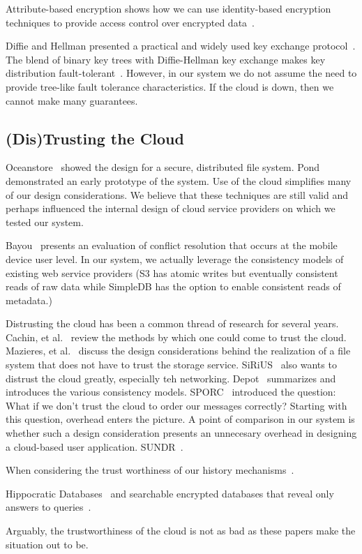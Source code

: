 Attribute-based encryption shows how we can use identity-based
encryption techniques to provide access control over encrypted
data~\cite{abe}. 

Diffie and Hellman presented a practical and widely used key exchange
protocol~\cite{dh}. The blend of binary key trees with Diffie-Hellman
key exchange makes key distribution fault-tolerant~\cite{treekeydist,
  treekeydist2}. However, in our system we do not assume the need to
provide tree-like fault tolerance characteristics. If the cloud is
down, then we cannot make many guarantees.

\subsection{(Dis)Trusting the Cloud}
Oceanstore~\cite{oceanstore} showed the design for a secure,
distributed file system. Pond~\cite{pond} demonstrated an early
prototype of the system. Use of the cloud simplifies many of our
design considerations. We believe that these techniques are still
valid and perhaps influenced the internal design of cloud service
providers on which we tested our system.

Bayou~\cite{bayou} presents an evaluation of conflict resolution that
occurs at the mobile device user level. In our system, we actually
leverage the consistency models of existing web service providers (S3
has atomic writes but eventually consistent reads of raw data while
SimpleDB has the option to enable consistent reads of metadata.)

Distrusting the cloud has been a common thread of research for several
years. Cachin, et al.~\cite{trusting} review the methods by which one
could come to trust the cloud. Mazieres, et al.~\cite{sfsbyzantine,
  donttrust} discuss the design considerations behind the realization
of a file system that does not have to trust the storage
service. SiRiUS~\cite{sirius} also wants to distrust the cloud
greatly, especially teh networking. Depot~\cite{depot} summarizes and
introduces the various consistency models. SPORC~\cite{sporc}
introduced the question: What if we don't trust the cloud to order our
messages correctly? Starting with this question, overhead enters the
picture. A point of comparison in our system is whether such a design
consideration presents an unnecesary overhead in designing a
cloud-based user application. SUNDR~\cite{sundr}.

When considering the trust worthiness of our history
mechanisms~\cite{fakepicasso}.

 Hippocratic
Databases~\cite{hippocratic} and searchable encrypted databases that
reveal only answers to queries~\cite{dawn}.

Arguably, the trustworthiness of the cloud is not as bad as these
papers make the situation out to be.

